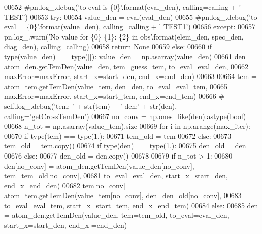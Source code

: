 \begin{DoxyCode}
{{{{00652             \textcolor{comment}{#pn.log\_.debug('to eval is \{0\}'.format(eval\_den), calling=calling + ' TEST')}
00653             \textcolor{keywordflow}{try}:
00654                 value\_den = eval(eval\_den)
00655                 \textcolor{comment}{#pn.log\_.debug('to eval = \{0\}'.format(value\_den), calling=calling + ' TEST1')}
00656             \textcolor{keywordflow}{except}:
00657                 pn.log\_.warn(\textcolor{stringliteral}{'No value for \{0\} \{1\}: \{2\} in obs'}.format(elem\_den, spec\_den, diag\_den), 
      calling=calling)
00658                 \textcolor{keywordflow}{return} \textcolor{keywordtype}{None}
00659         \textcolor{keywordflow}{else}:
00660             \textcolor{keywordflow}{if} type(value\_den) == type([]): value\_den = np.asarray(value\_den)
00661         den = atom\_den.getTemDen(value\_den, tem=guess\_tem, to\_eval=eval\_den,
00662                                  maxError=maxError, start\_x=start\_den, end\_x=end\_den)
00663         
00664         tem = atom\_tem.getTemDen(value\_tem, den=den, to\_eval=eval\_tem,
00665                                  maxError=maxError, start\_x=start\_tem, end\_x=end\_tem)
00666 \textcolor{comment}{#        self.log\_.debug('tem: ' + str(tem) + ' den:' + str(den), calling='getCrossTemDen')}
00667         no\_conv = np.ones\_like(den).astype(bool)
00668         n\_tot = np.asarray(value\_tem).size
00669         \textcolor{keywordflow}{for} i \textcolor{keywordflow}{in} np.arange(max\_iter):
00670             \textcolor{keywordflow}{if} type(tem) == type(1.):
00671                 tem\_old = tem
00672             \textcolor{keywordflow}{else}:
00673                 tem\_old = tem.copy()
00674             \textcolor{keywordflow}{if} type(den) == type(1.):
00675                 den\_old = den
00676             \textcolor{keywordflow}{else}:
00677                 den\_old = den.copy()
00678             
00679             \textcolor{keywordflow}{if} n\_tot > 1:
00680                 den[no\_conv] = atom\_den.getTemDen(value\_den[no\_conv], tem=tem\_old[no\_conv],
00681                                                   to\_eval=eval\_den, start\_x=start\_den, end\_x=end\_den)
00682                 tem[no\_conv] = atom\_tem.getTemDen(value\_tem[no\_conv], den=den\_old[no\_conv],
00683                                                   to\_eval=eval\_tem, start\_x=start\_tem, end\_x=end\_tem)
00684             \textcolor{keywordflow}{else}:
00685                 den = atom\_den.getTemDen(value\_den, tem=tem\_old, to\_eval=eval\_den, start\_x=start\_den, end\_x
      =end\_den)
}}}}
\end{DoxyCode}

